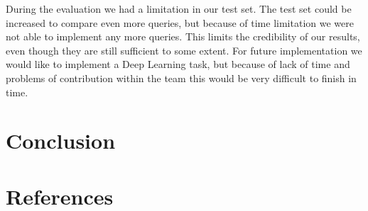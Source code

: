 During the evaluation we had a limitation in our test set. The test set could be increased to compare even more queries, but because of time limitation we were not able to implement any more queries. This limits the credibility of our results, even though they are still sufficient to some extent. For future implementation we would like to implement a Deep Learning task, but because of lack of time and problems of contribution within the team this would be very difficult to finish in time. 


\section{Conclusion} %
\label{sec:conclusion}


\section{References} %
\label{sec:references}



